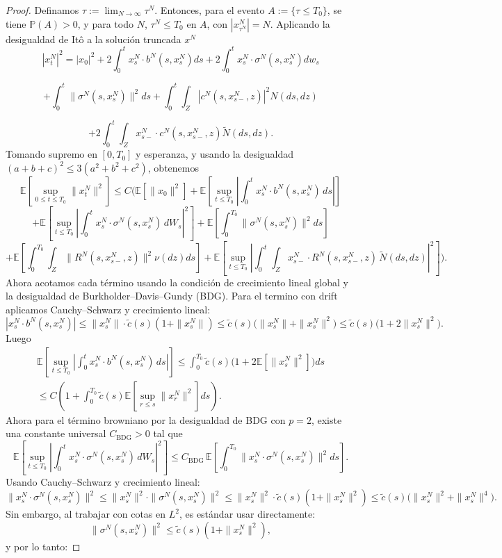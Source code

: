 \documentclass[
  spanish,
  us-letterpaper,
]{scrreprt}
\theoremstyle{plain}
\theoremstyle{plain}
\theoremstyle{definition}
\theoremstyle{remark}
\begin{document}
\begin{proof}
Definamos \(\tau := \lim_{N \to \infty} \tau^N\). Entonces, para el
evento \(A := \{ \tau \leq T_0 \}\), se tiene \(\mathbb{P}(A) > 0\), y
para todo \(N\), \(\tau^N \leq T_0\) en \(A\), con
\(|x_{\tau^N}^N| = N.\) Aplicando la desigualdad de Itô a la solución
truncada \(x^N\)
\[|x_t^N|^2 = |x_0|^2 + 2\int_0^t x_s^N \cdot b^N(s,x_s^N) ds + 2\int_0^t x_s^N \cdot \sigma^N(s,x_s^N) dw_s\]

\[+ \int_0^t \|\sigma^N(s,x_s^N)\|^2 ds + \int_0^t \int_Z |c^N(s,x_{s-}^N,z)|^2 N(ds,dz)\]

\[+ 2\int_0^t \int_Z x_{s-}^N \cdot c^N(s,x_{s-}^N,z) \tilde{N}(ds,dz).\]
Tomando supremo en \([0, T_0]\) y esperanza, y usando la desigualdad
\((a+b+c)^2 \leq 3(a^2 + b^2 + c^2)\), obtenemos
\[\mathbb{E}\left[ \sup_{0 \leq t \leq T_0} \|x_t^N\|^2 \right] \leq C\Bigg( 
\mathbb{E}[\|x_0\|^2] 
+ \mathbb{E}\left[ \sup_{t \leq T_0} \left| \int_0^t x_s^N \cdot b^N(s,x_s^N)\,ds \right| \right] \]
\[+ \mathbb{E}\left[ \sup_{t \leq T_0} \left| \int_0^t x_s^N \cdot \sigma^N(s,x_s^N)\,dW_s \right|^2 \right]
+ \mathbb{E}\left[ \int_0^{T_0} \|\sigma^N(s,x_s^N)\|^2 ds \right]\]
\[+ \mathbb{E}\left[ \int_0^{T_0} \int_Z \|R^N(s,x_{s-}^N,z)\|^2 \nu(dz) ds \right]
+ \mathbb{E}\left[ \sup_{t \leq T_0} \left| \int_0^t \int_Z x_{s-}^N \cdot R^N(s,x_{s-}^N,z)\,\tilde{N}(ds,dz) \right|^2 \right]
\Bigg).\] Ahora acotamos cada término usando la condición de crecimiento
lineal global y la desigualdad de Burkholder--Davis--Gundy (BDG). Para
el termino con drift aplicamos Cauchy--Schwarz y crecimiento lineal:
\[\left| x_s^N \cdot b^N(s,x_s^N) \right| \leq \|x_s^N\| \cdot \tilde{c}(s)(1 + \|x_s^N\|)
\leq \tilde{c}(s)\bigl(\|x_s^N\| + \|x_s^N\|^2\bigr)
\leq \tilde{c}(s)\bigl(1 + 2\|x_s^N\|^2\bigr).\] Luego \begin{align*}
\mathbb{E}\left[ \sup_{t \leq T_0} \left| \int_0^t x_s^N \cdot b^N(s,x_s^N)\,ds \right| \right]
\leq \int_0^{T_0} \tilde{c}(s)\bigl(1 + 2\mathbb{E}[\|x_s^N\|^2]\bigr) ds \\
\leq C\left(1 + \int_0^{T_0} \tilde{c}(s) \mathbb{E}\left[ \sup_{r \leq s} \|x_r^N\|^2 \right] ds\right).
\end{align*} Ahora para el término browniano por la desigualdad de BDG
con \(p=2\), existe una constante universal \(C_{\mathrm{BDG}} > 0\) tal
que
\[\mathbb{E}\left[ \sup_{t \leq T_0} \left| \int_0^t x_s^N \cdot \sigma^N(s,x_s^N)\,dW_s \right|^2 \right]
\leq C_{\mathrm{BDG}} \, \mathbb{E}\left[ \int_0^{T_0} \|x_s^N \cdot \sigma^N(s,x_s^N)\|^2 ds \right].\]
Usando Cauchy--Schwarz y crecimiento lineal:
\[\|x_s^N \cdot \sigma^N(s,x_s^N)\|^2 \leq \|x_s^N\|^2 \cdot \|\sigma^N(s,x_s^N)\|^2
\leq \|x_s^N\|^2 \cdot \tilde{c}(s)(1 + \|x_s^N\|^2)
\leq \tilde{c}(s)\bigl(\|x_s^N\|^2 + \|x_s^N\|^4\bigr).\] Sin embargo,
al trabajar con cotas en \(L^2\), es estándar usar directamente:
\[\|\sigma^N(s,x_s^N)\|^2 \leq \tilde{c}(s)(1 + \|x_s^N\|^2),\] y por lo
tanto:


\end{proof}
\end{document}
